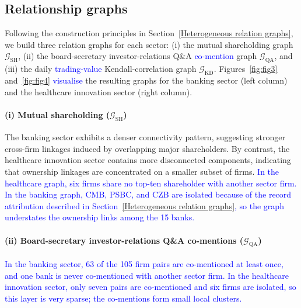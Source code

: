 \documentclass[pdflatex,sn-mathphys-num]{sn-jnl}%
\theoremstyle{thmstyleone}%
\theoremstyle{thmstyletwo}%
\theoremstyle{thmstylethree}%
\begin{document}
\subsection{Relationship graphs}\label{subsec:graphs}

Following the construction principles in Section~\ref{Heterogeneous relation graphs}, we build three relation graphs for each sector:
(i) the mutual shareholding graph $\mathcal{G}_{\mathrm{SH}}$,
(ii) the board-secretary investor-relations Q\&A \textcolor{blue}{co-mention} graph $\mathcal{G}_{\mathrm{QA}}$, and
(iii) the daily \textcolor{blue}{trading-value} Kendall-correlation graph $\mathcal{G}_{\mathrm{KD}}$.
Figures~\ref{fig:fig3} and~\ref{fig:fig4} \textcolor{blue}{visualise} the resulting graphs for the banking sector (left column) and the healthcare innovation sector (right column).

\paragraph{(i) Mutual shareholding ($\mathcal{G}_{\mathrm{SH}}$)}
The banking sector exhibits a denser connectivity pattern, suggesting stronger cross-firm linkages induced by overlapping major shareholders.
By contrast, the healthcare innovation sector contains more disconnected components, indicating that ownership linkages are concentrated on a smaller subset of firms. \textcolor{blue}{In the healthcare graph, six firms share no top-ten shareholder with another sector firm. In the banking graph, CMB, PSBC, and CZB are isolated because of the record attribution described in Section~\ref{Heterogeneous relation graphs}, so the graph understates the ownership links among the 15 banks.}

\paragraph{(ii) Board-secretary investor-relations Q\&A co-mentions ($\mathcal{G}_{\mathrm{QA}}$)}
\textcolor{blue}{In the banking sector, 63 of the 105 firm pairs are co-mentioned at least once, and one bank is never co-mentioned with another sector firm.}
\textcolor{blue}{In the healthcare innovation sector, only seven pairs are co-mentioned and six firms are isolated, so this layer is very sparse; the co-mentions form small local clusters.}
\end{document}
